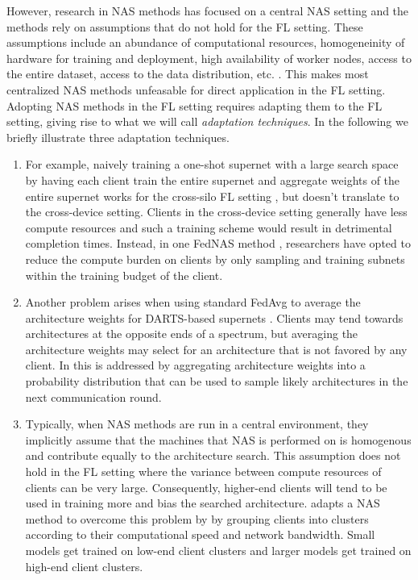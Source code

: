 However, research in NAS methods has focused on a central NAS setting and the methods rely on assumptions that do not hold for the FL setting. These assumptions include an abundance of computational resources, homogeneinity of hardware for training and deployment, high availability of worker nodes, access to the entire dataset, access to the data distribution, etc. \cite{fl_advances_and_open_problems_2021}. This makes most centralized NAS methods unfeasable for direct application in the FL setting. Adopting NAS methods in the FL setting requires adapting them to the FL setting, giving rise to what we will call \textit{adaptation techniques}. In the following we briefly illustrate three adaptation techniques. 

\begin{enumerate}
    \item For example, naively training a one-shot supernet with a large search space by having each client train the entire supernet and aggregate weights of the entire supernet works for the cross-silo FL setting \cite{fednas_2021}, but doesn't translate to the cross-device setting. Clients in the cross-device setting generally have less compute resources and such a training scheme would result in detrimental completion times. Instead, in one FedNAS method \cite{fedoras_2022}, researchers have opted to reduce the compute burden on clients by only sampling and training subnets within the training budget of the client.
    \item Another problem arises when using standard FedAvg to average the architecture weights for DARTS-based supernets \cite{darts_2019}. Clients may tend towards architectures at the opposite ends of a spectrum, but averaging the architecture weights may select for an architecture that is not favored by any client. In \cite{efnas_2024} this is addressed by aggregating architecture weights into a probability distribution that can be used to sample likely architectures in the next communication round.
    \item Typically, when NAS methods are run in a central environment, they implicitly assume that the machines that NAS is performed on is homogenous and contribute equally to the architecture search. This assumption does not hold in the FL setting where the variance between compute resources of clients can be very large. Consequently, higher-end clients will tend to be used in training more and bias the searched architecture. \cite{network_aware_fed_nas_2025} adapts a NAS method to overcome this problem by by grouping clients into clusters according to their computational speed and network bandwidth. Small models get trained on low-end client clusters and larger models get trained on high-end client clusters.
\end{enumerate}

